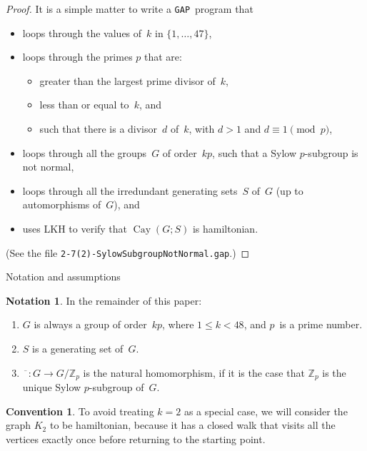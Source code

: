 \documentclass[]{amcjoucc}
\makeatletter
\theoremstyle{plain}
\theoremstyle{definition}
\newtheorem{convention}[equation]{Convention}
\newtheorem{notation}[equation]{Notation}
\theoremstyle{definition}
\newenvironment{justification}{\begingroup \renewcommand{\proofname}{Justification}\begin{proof}}{\end{proof}\endgroup}
\DeclareMathOperator{\Cay}{Cay}
\newcommand{\quot}{\overline}
\newcommand{\GAP}{\filename{GAP}}
\newcommand{\ZZ}{\mathbb{Z}}
\newcommand{\filename}[1]{\texttt{#1}}
\newcommand{\function}[1]{\textsf{#1}}
\newcommand{\noprelistbreak}{\smallskip\@nobreaktrue\nopagebreak}
\renewcommand{\subsection}{%
\@startsection{subsection}{2}{0pt}{-\baselineskip}{0.5\baselineskip}{\mathversion{bold}\bfseries}%
}
\makeatother
\begin{document}
\begin{justification}
It is a simple matter to write a \GAP\ program that
	\begin{itemize}
	\item loops through the values of~$k$ in $\{1,\ldots,47\}$, 
	\item loops through the primes $p$ that are:
		\begin{itemize}
		\item greater than the largest prime divisor of~$k$, 
		\item less than or equal to~$k$, 
		and 
		\item such that there is a divisor~$d$ of~$k$, with $d > 1$ and $d \equiv 1 \pmod{p}$,
		\end{itemize}
	\item loops through all the groups~$G$ of order~$kp$, such that a Sylow $p$-subgroup is not normal,
	\item loops through all the irredundant generating sets~$S$ of~$G$ (up to automorphisms of~$G$),
	and
	\item uses \function{LKH} to verify that $\Cay(G;S)$ is hamiltonian.
	\end{itemize}
(See the file \filename{2-7(2)-SylowSubgroupNotNormal.gap}.) 
\end{justification}


\subsection{Notation and assumptions} \label{AssumpSect}

\begin{notation} \label{GNotation} 
In the remainder of this paper:
\noprelistbreak
	\begin{enumerate}
	\item $G$ is always a group of order~$k p$, where $1 \le k < 48$, and $p$~is a prime number.
	\item $S$ is a generating set of~$G$.
	\item $\quot {\phantom{x}} \colon G \to G/\ZZ_p$ is the natural homomorphism, if it is the case that $\ZZ_p$ is the unique Sylow $p$-subgroup of~$G$. 
	\end{enumerate}
\end{notation}

\begin{convention}
To avoid treating $k = 2$ as a special case, we will consider the graph $K_2$ to be hamiltonian, because it has a closed walk that visits all the vertices exactly once before returning to the starting point.
\end{convention}
\end{document}
